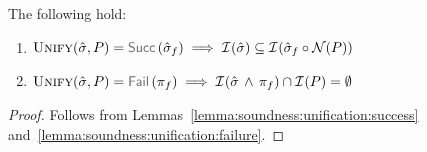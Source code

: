  \begin{temax}
The following hold: 
\begin{enumerate}%
\setlength{\itemsep}{0.1cm}
\item $\unificationfun(\sstate, \pass) = \success{\sstate_f}
        \implies 
        \interpret{}{}(\sstate) \subseteq \interpret{}{}(\sstate_f \statecompose \normaliser(\pass))$
 \item  $\unificationfun(\sstate, \pass) = \fail{\pc_f} 
   \implies
   \interpret{}{}(\sstate \, \wedge \, \pc_f) \cap \interpret{}{}(\pass) = \emptyset$
\end{enumerate}
 \end{temax}
 \begin{proof}
 Follows from Lemmas~\ref{lemma:soundness:unification:success} and~\ref{lemma:soundness:unification:failure}. 
 \end{proof}
 
